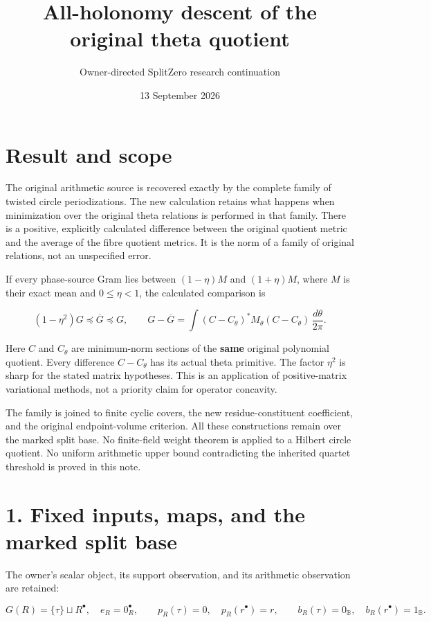 \documentclass[
]{article}
\title{All-holonomy descent of the original theta quotient}
\author{Owner-directed SplitZero research continuation}
\date{13 September 2026}
\begin{document}
\maketitle

\section{Result and scope}\label{result-and-scope}

The original arithmetic source is recovered exactly by the complete
family of twisted circle periodizations. The new calculation retains
what happens when minimization over the original theta relations is
performed in that family. There is a positive, explicitly calculated
difference between the original quotient metric and the average of the
fibre quotient metrics. It is the norm of a family of original
relations, not an unspecified error.

If every phase-source Gram lies between \((1-\eta)M\) and \((1+\eta)M\),
where \(M\) is their exact mean and \(0\leq\eta<1\), the calculated
comparison is

\[
 (1-\eta^2)G\preceq \overline G\preceq G,
 \qquad
 G-\overline G
 =\int (C-C_\theta)^*M_\theta(C-C_\theta)\,\frac{d\theta}{2\pi}.
 \tag{H1}
\]

Here \(C\) and \(C_\theta\) are minimum-norm sections of the
\textbf{same} original polynomial quotient. Every difference
\(C-C_\theta\) has its actual theta primitive. The factor \(\eta^2\) is
sharp for the stated matrix hypotheses. This is an application of
positive-matrix variational methods, not a priority claim for operator
concavity.

The family is joined to finite cyclic covers, the new
residue-constituent coefficient, and the original endpoint-volume
criterion. All these constructions remain over the marked split base. No
finite-field weight theorem is applied to a Hilbert circle quotient. No
uniform arithmetic upper bound contradicting the inherited quartet
threshold is proved in this note.

\section{1. Fixed inputs, maps, and the marked split
base}\label{fixed-inputs-maps-and-the-marked-split-base}

The owner's scalar object, its support observation, and its arithmetic
observation are retained:

\[
 G(R)=\{\tau\}\sqcup R^\bullet,\quad e_R=0_R^\bullet,\qquad
 p_R(\tau)=0,\quad p_R(r^\bullet)=r,\qquad
 b_R(\tau)=0_{\mathbb B},\quad b_R(r^\bullet)=1_{\mathbb B}.
 \tag{H2}
\]
\end{document}
